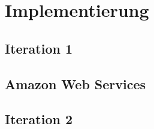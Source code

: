 \section{Implementierung}
\subsection{Iteration 1}
\subsection{Amazon Web Services}
\subsection{Iteration 2}
